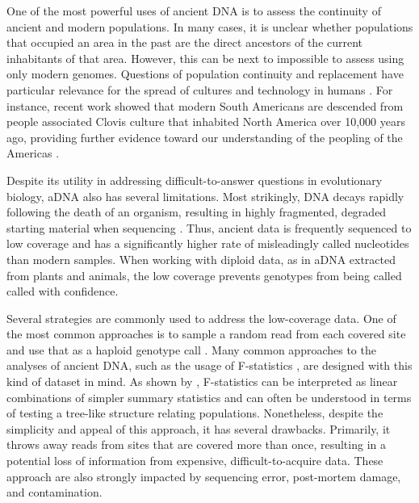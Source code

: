 \documentclass[11pt, oneside]{article}   	%
\begin{document}
One of the most powerful uses of ancient DNA is to assess the continuity of ancient and modern populations. In many cases, it is unclear whether populations that occupied an area in the past are the direct ancestors of the current inhabitants of that area. However, this can be next to impossible to assess using only modern genomes. Questions of population continuity and replacement have particular relevance for the spread of cultures and technology in humans \citep{lazaridis2016genomic}. For instance, recent work showed that modern South Americans are descended from people associated Clovis culture that inhabited North America over 10,000 years ago, providing further evidence toward our understanding of the peopling of the Americas \citep{rasmussen2014genome}.

Despite its utility in addressing difficult-to-answer questions in evolutionary biology, aDNA also has several limitations. Most strikingly, DNA decays rapidly following the death of an organism, resulting in highly fragmented, degraded starting material when sequencing \citep{sawyer2012temporal}. Thus, ancient data is frequently sequenced to low coverage and has a significantly higher rate of misleadingly called nucleotides than modern samples. When working with diploid data, as in aDNA extracted from plants and animals, the low coverage prevents genotypes from being called called with confidence.

Several strategies are commonly used to address the low-coverage data. One of the most common approaches is to sample a random read from each covered site and use that as a haploid genotype call \citep{skoglund2012origins, haak2015massive, mathieson2015genome, allentoft2015population, fu2016genetic, lazaridis2016genomic}. Many common approaches to the analyses of ancient DNA, such as the usage of F-statistics \citep{green2010draft, patterson2012ancient}, are designed with this kind of dataset in mind. As shown by \citet{peter2016admixture}, F-statistics can be interpreted as linear combinations of simpler summary statistics and can often be understood in terms of testing a tree-like structure relating populations. Nonetheless, despite the simplicity and appeal of this approach, it has several drawbacks. Primarily, it throws away reads from sites that are covered more than once, resulting in a potential loss of information from expensive, difficult-to-acquire data. These approach are also strongly impacted by sequencing error, post-mortem damage, and contamination.
\end{document}
